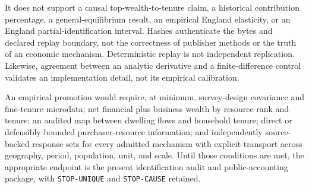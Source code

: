 It does not support a causal top-wealth-to-tenure claim, a historical
contribution percentage, a general-equilibrium result, an empirical England
elasticity, or an England partial-identification interval.  Hashes authenticate
the bytes and declared replay boundary, not the correctness of publisher
methods or the truth of an economic mechanism.  Deterministic replay is not
independent replication.  Likewise, agreement between an analytic derivative
and a finite-difference control validates an implementation detail, not its
empirical calibration.

An empirical promotion would require, at minimum, survey-design covariance and
fine-tenure microdata; net financial plus business wealth by resource rank and
tenure; an audited map between dwelling flows and household tenure; direct or
defensibly bounded purchaser-resource information; and independently
source-backed response sets for every admitted mechanism with explicit
transport across geography, period, population, unit, and scale.  Until those
conditions are met, the appropriate endpoint is the present identification
audit and public-accounting package, with \texttt{STOP-UNIQUE} and
\texttt{STOP-CAUSE} retained.

\clearpage
